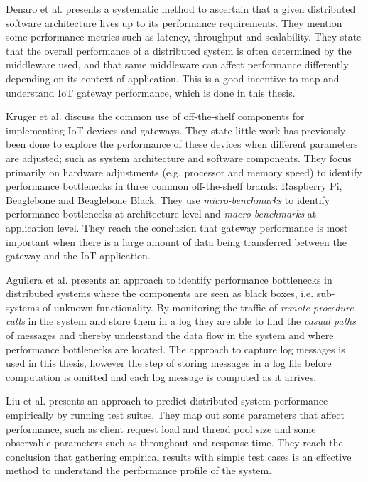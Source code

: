 Denaro et al. \cite{denaro2005performance} presents a systematic method to
ascertain that a given distributed software architecture lives up to its
performance requirements. They mention some performance metrics such as
latency, throughput and scalability. They state that the overall performance of
a distributed system is often determined by the middleware used, and that same
middleware can affect performance differently depending on its context of
application. This is a good incentive to map and understand IoT gateway
performance, which is done in this thesis.

Kruger et al. \cite{kruger2014benchmarking} discuss the common use of
off-the-shelf components for implementing IoT devices and gateways. They state
little work has previously been done to explore the performance of these
devices when different parameters are adjusted; such as system architecture and
software components. They focus primarily on hardware adjustments (e.g.
processor and memory speed) to identify performance bottlenecks in three common
off-the-shelf brands: Raspberry Pi, Beaglebone and Beaglebone Black. They use
\textit{micro-benchmarks} to identify performance bottlenecks at architecture
level and \textit{macro-benchmarks} at application level. They reach the
conclusion that gateway performance is most important when there is a large
amount of data being transferred between the gateway and the IoT application.

Aguilera et al. \cite{aguilera2003performance} presents an approach to identify
performance bottlenecks in distributed systems where the components are seen as
black boxes, i.e. sub-systems of unknown functionality. By monitoring the
traffic of \textit{remote procedure calls} in the system and store them in a
log they are able to find the \textit{casual paths} of messages and thereby
understand the data flow in the system and where performance bottlenecks are
located. The approach to capture log messages is used in this thesis, however
the step of storing messages in a log file before computation is omitted and
each log message is computed as it arrives.

Liu et al. \cite{liu2002designing} presents an approach to predict distributed
system performance empirically by running test suites. They map out some
parameters that affect performance, such as client request load and thread pool
size and some observable parameters such as throughout and response time. They
reach the conclusion that gathering empirical results with simple test cases is
an effective method to understand the performance profile of the system.

